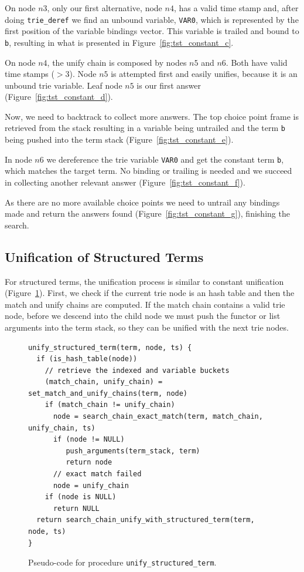 On node $n3$, only our first alternative, node $n4$, has a valid time stamp and, after doing
\texttt{trie\_deref} we find an unbound variable, \texttt{VAR0}, which is represented
by the first position of the variable bindings vector.
This variable is trailed and bound to \texttt{b},
resulting in what is presented in Figure~\ref{fig:tst_constant_c}.

On node $n4$, the unify chain is composed by nodes $n5$ and $n6$. Both have valid time stamps ($> 3$).
Node $n5$ is attempted first and easily unifies, because it is an unbound trie variable.
Leaf node $n5$ is our first answer (Figure~\ref{fig:tst_constant_d}).

Now, we need to backtrack to collect more answers. The top choice point frame is retrieved from the
stack resulting in a variable being untrailed and the term \texttt{b} being pushed into the term
stack (Figure~\ref{fig:tst_constant_e}).

In node $n6$ we dereference the trie variable \texttt{VAR0} and get the constant term \texttt{b},
which matches the target term. No binding or trailing is needed and we succeed in collecting another
relevant answer (Figure~\ref{fig:tst_constant_f}).

As there are no more available choice points we need to untrail any bindings made and return
the answers found (Figure~\ref{fig:tst_constant_g}), finishing the search.

\subsection{Unification of Structured Terms}

For structured terms, the unification process is similar to constant unification
(Figure~\ref{fig:unify_structured_term}). First, we check if the current trie node is an
hash table and then the match and unify chains are computed. If the match chain contains
a valid trie node, before we descend into the child node we must push the functor or list
arguments into the term stack, so they can be unified with the next trie nodes.

\begin{figure}[h]
\begin{Verbatim}
unify_structured_term(term, node, ts) {
  if (is_hash_table(node))
    // retrieve the indexed and variable buckets
    (match_chain, unify_chain) = set_match_and_unify_chains(term, node)
    if (match_chain != unify_chain)
      node = search_chain_exact_match(term, match_chain, unify_chain, ts)
      if (node != NULL)
         push_arguments(term_stack, term)
         return node
      // exact match failed
      node = unify_chain
    if (node is NULL)
      return NULL
  return search_chain_unify_with_structured_term(term, node, ts)
}
\end{Verbatim}
\caption{Pseudo-code for procedure \texttt{unify\_structured\_term}.}
\label{fig:unify_structured_term}
\end{figure}

